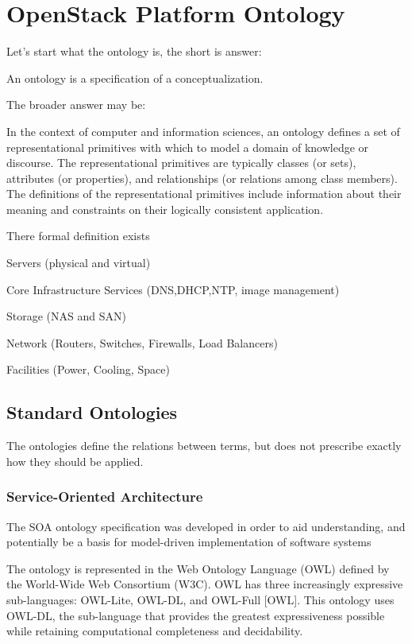 
\section{OpenStack Platform Ontology}

Let's start what the ontology is, the short is answer:

    An ontology is a specification of a conceptualization. 

The broader answer may be:

	In the context of computer and information sciences, an ontology defines a set of representational primitives with which to model a domain of knowledge or discourse.  The representational primitives are typically classes (or sets), attributes (or properties), and relationships (or relations among class members). The definitions of the representational primitives include information about their meaning and constraints on their logically consistent application.

There formal definition exists

Servers (physical and virtual)

Core Infrastructure Services (DNS,DHCP,NTP, image management)

Storage (NAS and SAN)

Network (Routers, Switches, Firewalls, Load Balancers)

Facilities (Power, Cooling, Space)

\subsection{Standard Ontologies}

The ontologies define the relations between terms, but does not prescribe exactly how they should be applied. 

\subsubsection{Service-Oriented Architecture}

The SOA ontology specification was developed in order to aid understanding, and potentially be a basis for model-driven implementation of software systems

The ontology is represented in the Web Ontology Language (OWL) defined by the World-Wide Web Consortium (W3C). OWL has three increasingly expressive sub-languages: OWL-Lite, OWL-DL, and OWL-Full [OWL]. This ontology uses OWL-DL, the sub-language that provides the greatest expressiveness possible while retaining computational completeness and decidability.

